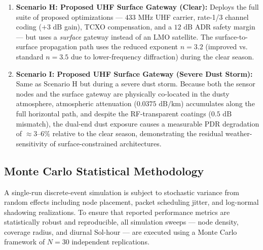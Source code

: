 \documentclass[journal,10pt,doublecolumn]{IEEEtran}
\begin{document}
\begin{enumerate}
    \item \textbf{Scenario H: Proposed UHF Surface Gateway (Clear):} Deploys the full suite of proposed optimizations --- $433\text{ MHz}$ UHF carrier, rate-1/3 channel coding ($+3\text{ dB}$ gain), TCXO compensation, and a $12\text{ dB}$ ADR safety margin --- but uses a \emph{surface} gateway instead of an LMO satellite. The surface-to-surface propagation path uses the reduced exponent $n=3.2$ (improved vs. standard $n=3.5$ due to lower-frequency diffraction) during the clear season.
    \item \textbf{Scenario I: Proposed UHF Surface Gateway (Severe Dust Storm):} Same as Scenario H but during a severe dust storm. Because both the sensor nodes and the surface gateway are physically co-located in the dusty atmosphere, atmospheric attenuation ($0.0375\text{ dB/km}$) accumulates along the full horizontal path, and despite the RF-transparent coatings ($0.5\text{ dB}$ mismatch), the dual-end dust exposure causes a measurable PDR degradation of $\approx 3$--$6\%$ relative to the clear season, demonstrating the residual weather-sensitivity of surface-constrained architectures.
\end{enumerate}

\subsection{Monte Carlo Statistical Methodology}
\label{subsec:montecarlo}

A single-run discrete-event simulation is subject to stochastic variance from random effects including node placement, packet scheduling jitter, and log-normal shadowing realizations. To ensure that reported performance metrics are statistically robust and reproducible, all simulation sweeps --- node density, coverage radius, and diurnal Sol-hour --- are executed using a Monte Carlo framework of $N = 30$ independent replications.
\end{document}
